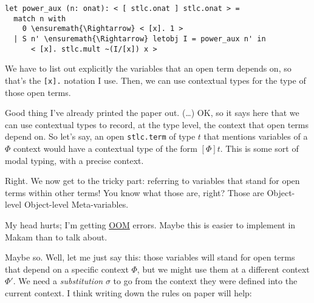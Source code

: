 \begin{verbatim}
let power_aux (n: onat): < [ stlc.onat ] stlc.onat > =
  match n with
    0 \ensuremath{\Rightarrow} < [x]. 1 >
  | S n' \ensuremath{\Rightarrow} letobj I = power_aux n' in
      < [x]. stlc.mult ~(I/[x]) x >
\end{verbatim}

\noindent
We have to list out explicitly the variables that an open term depends
on, so that's the \texttt{{[}x{]}.} notation I use. Then, we can use
contextual types \citep{nanevski2008contextual} for the type of those
open terms.

\heroSTUDENT{} Good thing I've already printed the paper out. (\ldots{}) OK,
so it says here that we can use contextual types to record, at the type
level, the context that open terms depend on. So let's say, an open
\texttt{stlc.term} of type \(t\) that mentions variables of a \(\Phi\)
context would have a contextual type of the form \([\Phi] t\). This is
some sort of modal typing, with a precise context.

\heroADVISOR{} Right. We now get to the tricky part: referring to variables
that stand for open terms within other terms! You know what those are,
right? Those are Object-level Object-level Meta-variables.

\heroSTUDENT{} My head hurts; I'm getting
\href{https://en.wikipedia.org/wiki/Out_of_memory}{OOM} errors. Maybe
this is easier to implement in Makam than to talk about.

\heroADVISOR{} Maybe so. Well, let me just say this: those variables will
stand for open terms that depend on a specific context \(\Phi\), but we
might use them at a different context \(\Phi'\). We need a
\emph{substitution} \(\sigma\) to go from the context they were defined
into the current context. I think writing down the rules on paper will
help:

